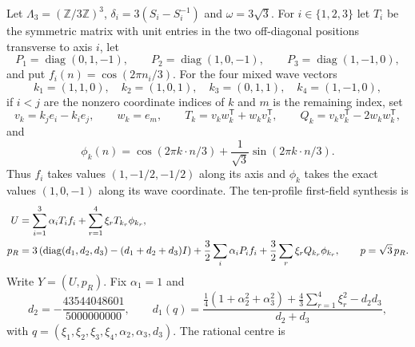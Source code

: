 \documentclass[11pt]{article}
\numberwithin{equation}{section}
\theoremstyle{definition}
\theoremstyle{remark}
\newcommand{\diag}{\operatorname{diag}}
\begin{document}
Let $\Lambda_3=(\mathbb Z/3\mathbb Z)^3$,
$\delta_i=3(S_i-S_i^{-1})$ and $\omega=3\sqrt3$.  For
$i\in\{1,2,3\}$ let $T_i$ be the symmetric matrix with unit entries in the
two off-diagonal positions transverse to axis $i$, let
\begin{equation}
 P_1=\diag(0,1,-1),\qquad
 P_2=\diag(1,0,-1),\qquad
 P_3=\diag(1,-1,0),
 \label{eq:supp-certified-axial-polarizations}
\end{equation}
and put $f_i(n)=\cos(2\pi n_i/3)$.  For the four mixed wave vectors
\begin{equation}
 k_1=(1,1,0),\quad k_2=(1,0,1),\quad
 k_3=(0,1,1),\quad k_4=(1,-1,0),
 \label{eq:supp-certified-mixed-waves}
\end{equation}
if $i<j$ are the nonzero coordinate indices of $k$ and $m$ is the remaining
index, set
\begin{equation}
 v_k=k_je_i-k_ie_j,\qquad w_k=e_m,\qquad
 T_k=v_kw_k^{\mathsf T}+w_kv_k^{\mathsf T},\qquad
 Q_k=v_kv_k^{\mathsf T}-2w_kw_k^{\mathsf T},
 \label{eq:supp-certified-mixed-polarizations}
\end{equation}
and
\begin{equation}
 \phi_k(n)=\cos(2\pi k\!\cdot\!n/3)
 +\frac1{\sqrt3}\sin(2\pi k\!\cdot\!n/3).
 \label{eq:supp-certified-mixed-profile}
\end{equation}
Thus $f_i$ takes values $(1,-1/2,-1/2)$ along its axis and $\phi_k$ takes
the exact values $(1,0,-1)$ along its wave coordinate.  The ten-profile
first-field synthesis is
\begin{align}
 U&=\sum_{i=1}^3\alpha_iT_if_i
       +\sum_{r=1}^4\xi_rT_{k_r}\phi_{k_r},\notag\\
 p_R&=3\left(\diag(d_1,d_2,d_3)-(d_1+d_2+d_3)I\right)
       +\frac32\sum_i\alpha_iP_if_i
       +\frac32\sum_r\xi_rQ_{k_r}\phi_{k_r},
 \qquad p=\sqrt3\,p_R.
 \label{eq:supp-certified-ten-field}
\end{align}
Write $Y=(U,p_R)$.  Fix $\alpha_1=1$ and
\begin{equation}
 d_2=-\frac{43544048601}{5000000000},
 \qquad
 d_1(q)=
 \frac{\frac14(1+\alpha_2^2+\alpha_3^2)
 +\frac43\sum_{r=1}^4\xi_r^2-d_2d_3}{d_2+d_3},
 \label{eq:supp-certified-calibration}
\end{equation}
with
$q=(\xi_1,\xi_2,\xi_3,\xi_4,\alpha_2,\alpha_3,d_3)$.
The rational centre is
\end{document}
